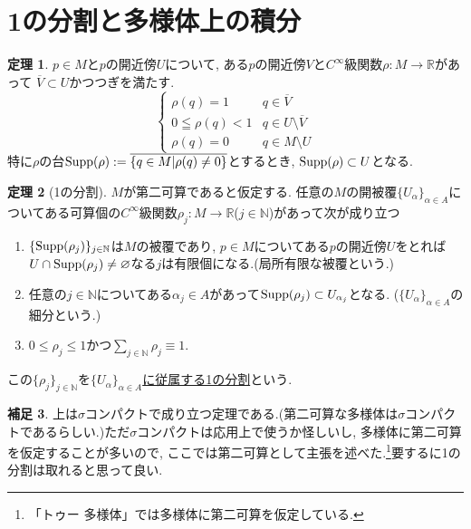 \documentclass[dvipdfmx,a4paper,11pt]{article}
\newcommand{\R}{\mathbb{R}}
\newcommand{\N}{\mathbb{N}}
\newcommand{\Supp}{{\rm Supp}}
\theoremstyle{definition}
\newtheorem{thm}{定理}
\newtheorem{rem}[thm]{補足}
\begin{document}
    
      
 \section{1の分割と多様体上の積分}
 
  \begin{tcolorbox}[
    colback = white,
    colframe = green!35!black,
    fonttitle = \bfseries,
    breakable = true]
\begin{thm}
$p \in M$と$p$の開近傍$U$について, ある$p$の開近傍$V$と$C^{\infty}$級関数$\rho : M \rightarrow \R$があって
$\overline{V} \subset U$かつつぎを満たす.
$$
\left\{
\begin{array}{ll}
\rho(q) =1& q \in \overline{V} \\
0 \leqq \rho(q) <1& q \in U \setminus \overline{V}\\
\rho(q)=0&q \in M \setminus U
\end{array}
\right.
$$
特に$\rho$の台${\rm Supp}(\rho) :=\overline{\{q \in M | \rho(q) \neq 0 \}}$とするとき, $\Supp(\rho) \subset U$となる.
     \end{thm}
    \end{tcolorbox} 
    
 \begin{tcolorbox}[
    colback = white,
    colframe = green!35!black,
    fonttitle = \bfseries,
    breakable = true]
\begin{thm}[1の分割]
$M$が第二可算であると仮定する.
任意の$M$の開被覆$\{U_{\alpha}\}_{\alpha \in A}$についてある可算個の$C^{\infty}$級関数$\rho_{j} : M \rightarrow \R$($j \in \N$)があって次が成り立つ
\begin{enumerate}
 \setlength{\parskip}{0cm}
  \setlength{\itemsep}{2pt} 
\item $\{ \Supp(\rho_{j})\}_{j \in \N}$は$M$の被覆であり, $p \in M$についてある$p$の開近傍$U$をとれば$U \cap \Supp(\rho_{j}) \neq \varnothing$なる$j$は有限個になる.(局所有限な被覆という.)
\item 任意の$j \in \N$についてある$\alpha_{j} \in A$があって$\Supp(\rho_{j}) \subset U_{\alpha_j}$となる. ($\{U_{\alpha}\}_{\alpha \in A}$の細分という.)
\item $0 \le \rho_j \le 1$かつ$\sum_{j \in \N} \rho_{j} \equiv 1$.
\end{enumerate}
この$\{ \rho_{j} \}_{j \in \N}$を\underline{$\{U_{\alpha}\}_{\alpha \in A}$に従属する1の分割}という.
     \end{thm}
    \end{tcolorbox} 
\begin{rem}
上は$\sigma$コンパクトで成り立つ定理である.(第二可算な多様体は$\sigma$コンパクトであるらしい.)ただ$\sigma$コンパクトは応用上で使うか怪しいし, 多様体に第二可算を仮定することが多いので, ここでは第二可算として主張を述べた.\footnote{「トゥー 多様体」では多様体に第二可算を仮定している.}要するに1の分割は取れると思って良い. 
\end{rem}
\end{document}
